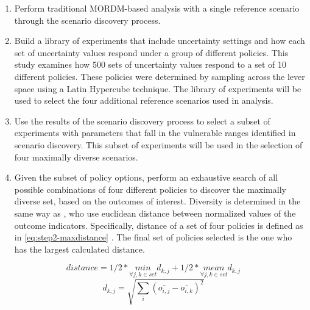     \begin{enumerate}[leftmargin=*]
        \item Perform traditional MORDM-based analysis with a single reference scenario through the scenario discovery process. 
        \item Build a library of experiments that include uncertainty settings and how each set of uncertainty values respond under a group of different policies. This study examines how 500 sets of uncertainty values respond to a set of 10 different policies. These policies were determined by sampling across the lever space using a Latin Hypercube technique. The library of experiments will be used to select the four additional reference scenarios used in analysis. 
        \item Use the results of the scenario discovery process to select a subset of experiments with parameters that fall in the vulnerable ranges identified in scenario discovery. This subset of experiments will be used in the selection of four maximally diverse scenarios. 
        \item Given the subset of policy options, perform an exhaustive search of all possible combinations of four different policies to discover the maximally diverse set, based on the outcomes of interest. Diversity is determined in the same way as \citep{Eker2018}, who use euclidean distance between normalized values of the outcome indicators. Specifically, distance of a set of four policies is defined as in \cref{eq:step2-maxdistance} \citep{Carlsen2016}. The final set of policies selected is the one who has the largest calculated distance.
    \end{enumerate}
    
    \begin{equation}\label{eq:step2-maxdistance}
    distance = 1/2 * \underset{\forall j,k \in set}{min}{d_{k,j}} + 
               1/2 * \underset{\forall j,k \in set}{mean} {d_{k,j}}
    \end{equation}
    \begin{equation}\label{eq:step2-distancedef}
     d_{k,j} = \sqrt{\sum_{i} (\bar{o_{i,j}} - \bar{o_{i,k}})^{2}}
    \end{equation}

